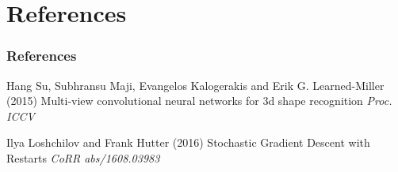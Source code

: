 \documentclass{beamer}
\begin{document}

	



\section{References} %

\begin{frame}
	\frametitle{References}
	\footnotesize{
		\begin{thebibliography}{99} %
			 Hang Su, Subhransu Maji, Evangelos Kalogerakis and Erik G. Learned{-}Miller (2015)
			\newblock Multi-view convolutional neural networks for 3d shape recognition
			\newblock \emph{Proc. ICCV}
		\end{thebibliography}

		\begin{thebibliography}{99} %
			 Ilya Loshchilov and Frank Hutter (2016)
			 Stochastic Gradient Descent with Restarts
			\newblock \emph{CoRR abs/1608.03983}
		\end{thebibliography}
	}
\end{frame}
\end{document}
